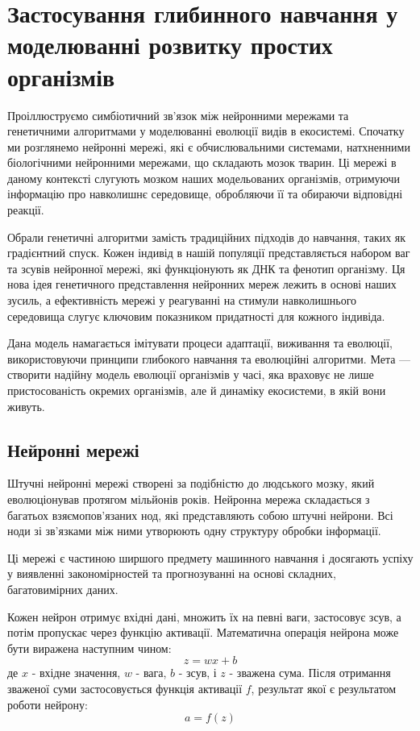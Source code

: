 \chapter{Застосування глибинного навчання у моделюванні розвитку простих організмів}
\label{chap:theory}

Проіллюструємо симбіотичний зв'язок між нейронними 
мережами та генетичними алгоритмами у моделюванні 
еволюції видів в екосистемі. 
Спочатку ми розглянемо нейронні мережі, 
які є обчислювальними системами, 
натхненними біологічними нейронними мережами, 
що складають мозок тварин. 
Ці мережі в даному контексті слугують мозком 
наших модельованих організмів, 
отримуючи інформацію про навколишнє середовище, 
обробляючи її та обираючи відповідні реакції.

Обрали генетичні алгоритми замість традиційних підходів до навчання, 
таких як градієнтний спуск. 
Кожен індивід в нашій популяції представляється
набором ваг та зсувів нейронної мережі, 
які функціонують як ДНК та фенотип організму. 
Ця нова ідея генетичного представлення нейронних мереж лежить 
в основі наших зусиль, а ефективність мережі у 
реагуванні на стимули навколишнього середовища слугує 
ключовим показником придатності для кожного індивіда.

Дана модель намагається імітувати процеси адаптації, 
виживання та еволюції, використовуючи принципи глибокого 
навчання та еволюційні алгоритми. 
Мета --- створити надійну модель еволюції організмів у часі, 
яка враховує не лише пристосованість окремих організмів, 
але й динаміку екосистеми, в якій вони живуть. 


\section{Нейронні мережі}

Штучні нейронні мережі створені за подібністю до людського мозку, 
який еволюціонував протягом мільйонів років.
Нейронна мережа складається з багатьох взяємопов'язаних нод, 
які представляють собою штучні нейрони. 
Всі ноди зі зв'язками між ними утворюють одну 
структуру обробки інформації.

Ці мережі є частиною ширшого предмету 
машинного навчання і досягають успіху у виявленні 
закономірностей та прогнозуванні на основі складних, 
багатовимірних даних.


Кожен нейрон отримує вхідні дані, 
множить їх на певні ваги, застосовує зсув, 
а потім пропускає через функцію активації. 
Математична операція нейрона може бути виражена 
наступним чином: 
\[ z = w x + b \]
де $x$ - вхідне значення, $w$ - вага, 
$b$ - зсув, і $z$ - зважена сума. 
Після отримання зваженої суми застосовується
функція активації $f$, результат якої є результатом роботи нейрону:
\[ a = f(z) \] 

